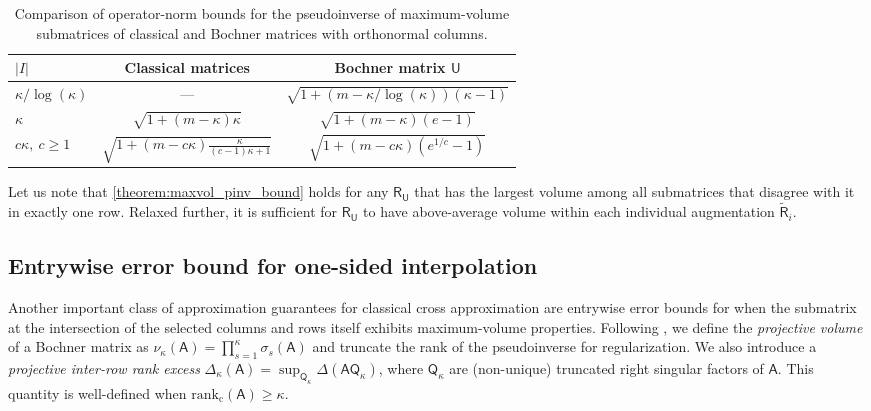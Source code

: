 \documentclass[onefignum,onetabnum]{siamart250211}
\newcommand{\Batrix}[1]{\bm{\Matrix{#1}}}
\newcommand{\Matrix}[1]{\mathsf{#1}}
\newcommand{\Rank}[3][]{\mathrm{rank_{#2}} #1( #3 #1)}
\newcommand{\Index}[1]{{#1}}
\begin{document}
\begin{table}[htb!]
\centering
\caption{Comparison of operator-norm bounds for the pseudoinverse of maximum-volume submatrices of classical and Bochner matrices with orthonormal columns.}
\label{tab:maxvol_comparison}
\begin{tabular*}{\textwidth}{@{\extracolsep\fill}lcc@{}}
    \toprule
    $|\Index{I}|$ & Classical matrices & Bochner matrix $\Batrix{U}$ \\
    \midrule
    $\kappa / \log(\kappa)$  & --- & $\sqrt{1 + (m - \kappa / \log(\kappa)) (\kappa - 1)}$ \\
    $\kappa$  & $\sqrt{1 + (m - \kappa) \kappa}$ & $\sqrt{1 + (m - \kappa) (e - 1)}$ \\
    $c\kappa,~c \geq 1$  & $\sqrt{1 + (m - c\kappa) \frac{\kappa}{(c-1)\kappa + 1}}$ & $\sqrt{1 + (m - c\kappa) (e^{1/c} - 1)}$ \\
    \bottomrule
\end{tabular*}
\end{table}

Let us note that \cref{theorem:maxvol_pinv_bound} holds for any $\Batrix{R}_{\Batrix{U}}$ that has the largest volume among all submatrices that disagree with it in exactly one row.
Relaxed further, it is sufficient for $\Batrix{R}_{\Batrix{U}}$ to have above-average volume within each individual augmentation $\tilde{\Batrix{R}}_{i}$.

\subsection{Entrywise error bound for one-sided interpolation}
Another important class of approximation guarantees for classical cross approximation are entrywise error bounds for when the submatrix at the intersection of the selected columns and rows itself exhibits maximum-volume properties.
Following \cite{osinsky2018pseudo}, we define the \emph{projective volume} of a Bochner matrix as $\nu_{\kappa}(\Batrix{A}) = \prod_{s = 1}^{\kappa} \sigma_s(\Batrix{A})$ and truncate the rank of the pseudoinverse for regularization.
We also introduce a \emph{projective inter-row rank excess} $\Delta_{\kappa}(\Batrix{A}) = \sup_{\Matrix{Q}_{\kappa}} \Delta(\Batrix{A} \Matrix{Q}_{\kappa})$, where $\Matrix{Q}_\kappa$ are (non-unique) truncated right singular factors of $\Batrix{A}$.
This quantity is well-defined when $\Rank{c}{\Batrix{A}} \geq \kappa$.
\end{document}
